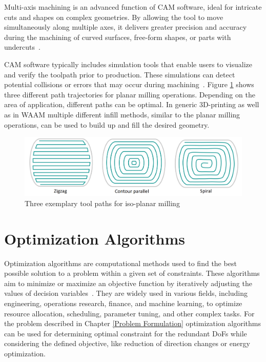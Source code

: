 Multi-axis machining is an advanced function of \acrshort{CAM} software, ideal for intricate cuts and shapes on complex geometries. By allowing the tool to move simultaneously along multiple axes, it delivers greater precision and accuracy during the machining of curved surfaces, free-form shapes, or parts with undercuts~\cite{Takeuchi.2014}.

\acrshort{CAM} software typically includes simulation tools that enable users to visualize and verify the toolpath prior to production. These simulations can detect potential collisions or errors that may occur during machining~\cite{Dubovska.2014}. 
\newpage
Figure \ref{3path} shows three different path trajectories for planar milling operations. Depending on the area of application, different paths can be optimal. In generic 3D-printing as well as in \acrshort{WAAM} multiple different infill methods, similar to the planar milling operations, can be used to build up and fill the desired geometry.  

\begin{figure}[H]
	\centerline{\includegraphics[width=1\textwidth]{figures/path.png}}
	\caption{Three exemplary tool paths for iso-planar milling~\cite{Zhao.2018}}
	\label{3path}
\end{figure}

\section{Optimization Algorithms}\label{OA}

Optimization algorithms are computational methods used to find the best possible solution to a problem within a given set of constraints. These algorithms aim to minimize or maximize an objective function by iteratively adjusting the values of decision variables~\cite{Sivanandam.2007b}. They are widely used in various fields, including engineering, operations research, finance, and machine learning, to optimize resource allocation, scheduling, parameter tuning, and other complex tasks. For the problem described in Chapter \ref{Problem Formulation} optimization algorithms can be used for determining optimal constraint for the redundant \acrshort{DoF}s while considering the defined objective, like reduction of direction changes or energy optimization. 



